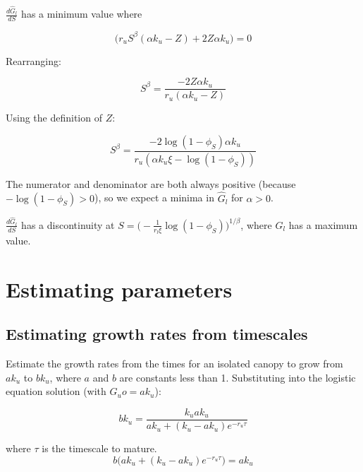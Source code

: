 \documentclass{article}
\begin{document}
     $\frac{d \hat{G}_l}{dS}$  has a minimum value where
    
      \begin{equation}
      \big( {r_u} S^{\beta }(\alpha  {k_u}  - Z) +2 Z \alpha  {k_u}
       \big) = 0
    \end{equation}
    
    Rearranging:
    
      \begin{equation}
     S^{\beta } = \frac{-2 Z \alpha  {k_u} }{{r_u}(\alpha  {k_u}  - Z)  }
    \end{equation}
    
    Using the definition of $Z$:
    
      \begin{equation}
     S^{\beta } = \frac{-2 {\log({1-\phi_S})} \alpha  {k_u} }{{r_u}(\alpha  {k_u} \xi - {\log({1-\phi_S})})  }
    \end{equation}
    
    The numerator and denominator are both always positive (because $- \log(1-\phi_S) > 0$), so we expect a minima in $\hat G_l$ for $\alpha > 0$.
    
     $\frac{d \hat{G}_l}{dS}$ has a discontinuity at  $ S = \big( - \frac{1}{r_l \xi }\log (1 - \phi_S)\big)^{1/\beta}$, where $G_l$ has a maximum value.
    


\section{Estimating parameters}
\subsection{Estimating growth rates from timescales}

Estimate the growth rates from the times for an isolated canopy to grow from $a k_u$ to $b k_u$, where $a$ and $b$ are constants less than 1.
Substituting into the logistic equation solution (with $ G_uo = a k_u$):

\begin{equation}
    b k_u = \frac{k_u  a k_u }{ a k_u +(k_u- a k_u) e^{-r_u \tau}}
\end{equation}

where $\tau$ is the timescale to mature.
\begin{equation}
    b ({ a k_u +(k_u- a k_u) e^{-r_u \tau}) ={ a k_u }}
\end{equation}
\end{document}

